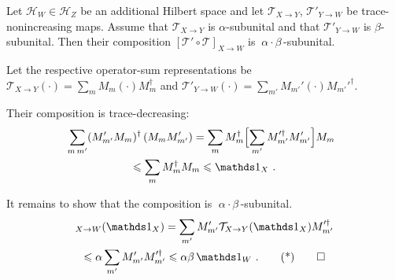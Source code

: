 \documentclass[11pt,a4paper]{article}
\def\Hs{\mathscr{H}}%
\newenvironment{myproof}[1][\proofname]{%
  \color{prooftextcolor} \footnotesize \proof[\itshape #1]\hspace*{1.2mm}%
}{\endproof}
\begin{document}
\begin{prop}
  \label{prop:CompositionOfAlphaSubunitalMaps}
  Let $\Hs_W\in\Hs_Z$ be an additional Hilbert space and let $\mathcal{T}_{X\rightarrow Y}$,
  $\mathcal{T}'_{Y\rightarrow W}$ be trace-nonincreasing maps. Assume that $\mathcal{T}_{X\rightarrow Y}$ is
  $\alpha$-subunital and that $\mathcal{T}'_{Y\rightarrow W}$ is $\beta$-subunital. Then their composition
  $\left[\mathcal{T}'\circ\mathcal{T}\right]_{X\rightarrow W}$ is $\:\alpha\cdot\beta\,$-subunital.
\end{prop}
\begin{myproof}[Proof of Prop.~\ref{prop:CompositionOfAlphaSubunitalMaps}]
  Let the respective operator-sum representations be
  $\mathcal{T}_{X\rightarrow Y}(\cdot) = \sum_m M_m \left(\cdot\right) M_m^\dagger$ and
  $\mathcal{T}'_{Y\rightarrow W}(\cdot) = \sum_{m'} M_{m'}' \left(\cdot\right) M_{m'}'^\dagger$.

  Their composition is trace-decreasing:
  \begin{multline*}
    \hspace*{-2mm}\sum_{m\,m'} (M_{m'}' M_m)^\dagger \, (M_m M_{m'}')
    = \sum_m M_m^\dagger \Bigl[ \sum_{m'} M_{m'}'^\dagger M_{m'}' \Bigr] M_m \\
    \leqslant \sum_m M_m^\dagger M_m
    \leqslant \Ident_X\ .
  \end{multline*}

  It remains to show that the composition is $\;\alpha\cdot\beta\,$-subunital.
  \begin{multline*}
    [\mathcal{T}'\circ\mathcal{T}]_{X\rightarrow W}(\Ident_X)
    = \sum_{m'} M_{m'}' \mathcal{T}_{X\rightarrow Y}(\Ident_X) M_{m'}'^\dagger \\
    \leqslant \alpha \sum_{m'} M_{m'}' M_{m'}'^\dagger \leqslant \alpha\beta\,\Ident_W\ . \tag*\qedhere
  \end{multline*}
\end{myproof}
\end{document}

